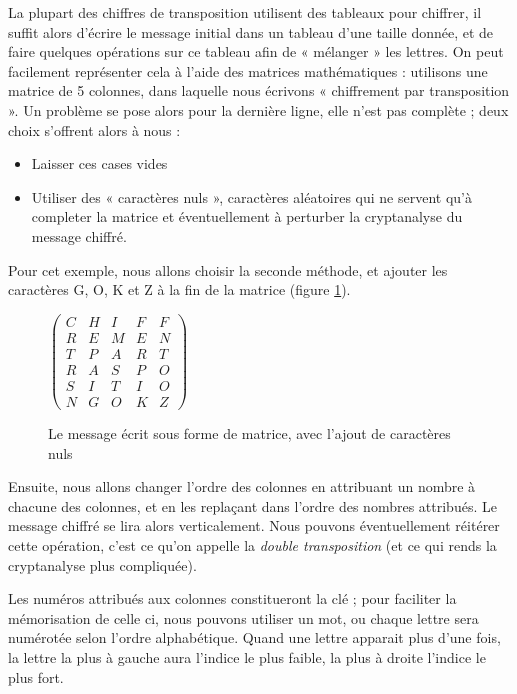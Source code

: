 La plupart des chiffres de transposition utilisent des tableaux pour
chiffrer, il suffit alors d'écrire le message initial dans un tableau
d'une taille donnée, et de faire quelques opérations sur ce tableau
afin de « mélanger » les lettres. On peut facilement représenter cela
à l'aide des matrices mathématiques : utilisons une matrice de 5
colonnes, dans laquelle nous écrivons « chiffrement par transposition
». Un problème se pose alors pour la dernière ligne, elle n'est pas
complète ; deux choix s'offrent alors à nous : 
\begin{itemize}
  \item Laisser ces cases vides
  \item Utiliser des « caractères nuls », caractères aléatoires qui ne
    servent qu'à completer la matrice et éventuellement à perturber la
    cryptanalyse du message chiffré.
\end{itemize}
Pour cet exemple, nous allons choisir la seconde méthode, et ajouter
les caractères G, O, K et Z à la fin de la matrice (figure
\ref{fig:TranspositionMatriceNul}).
\begin{figure}[h]
  \begin{center}
  $
  \left(
    \begin{array}{ccccc}
      C & H & I & F & F \\
      R & E & M & E & N \\
      T & P & A & R & T \\
      R & A & S & P & O \\
      S & I & T & I & O \\
      N & G & O & K & Z 
    \end{array}
  \right)
  $
  \end{center}
  \caption{Le message écrit sous forme de matrice, avec l'ajout de
    caractères nuls}
  \label{fig:TranspositionMatriceNul}
\end{figure}

Ensuite, nous allons changer l'ordre des colonnes en attribuant un
nombre à chacune des colonnes, et en les replaçant dans l'ordre des
nombres attribués. Le message chiffré se lira alors verticalement.
Nous pouvons éventuellement réitérer cette opération, c'est ce qu'on
appelle la \emph{double transposition} (et ce qui rends la cryptanalyse plus
compliquée).

Les numéros attribués aux colonnes constitueront la clé ; pour
faciliter la mémorisation de celle ci, nous pouvons utiliser un mot,
ou chaque lettre sera numérotée selon l'ordre alphabétique. Quand une
lettre apparait plus d'une fois, la lettre la plus à gauche aura
l'indice le plus faible, la plus à droite l'indice le plus fort.

